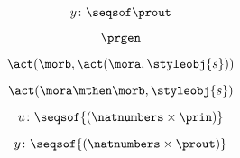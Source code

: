 {\begin{forslides}
        \begin{equation}
            \label{eq:prgen-y-2}
            y\colon \seqsof  \prout
        \end{equation}

        \begin{equation}
            \label{eq:prgen}
            \prgen
        \end{equation}

        \begin{equation}
            \label{eq:now1}
            \act(\morb, \act(\mora, \styleobj{s}))
        \end{equation}


        \begin{equation}
            \label{eq:now2}
            \act(\mora\mthen\morb, \styleobj{s})
        \end{equation}

        \begin{equation}
            \label{eq:ev-sign}
            u\colon \seqsof{(\natnumbers \times \prin)}
        \end{equation}

        \begin{equation}
            \label{eq:ev-sign2}
            y\colon \seqsof{(\natnumbers \times \prout)}
        \end{equation}

    \end{forslides}
}

\publictodomessage
